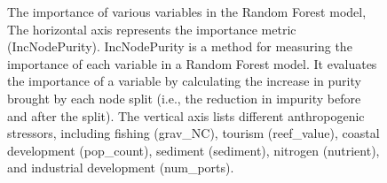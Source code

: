 \documentclass[a4paper, 11]{article}
\begin{document}
\begin{figure}[H]
    \centering
    \caption{The importance of various variables in the Random Forest model, The horizontal axis represents the importance metric (IncNodePurity). IncNodePurity is a method for measuring the importance of each variable in a Random Forest model. It evaluates the importance of a variable by calculating the increase in purity brought by each node split (i.e., the reduction in impurity before and after the split). The vertical axis lists different anthropogenic stressors, including fishing (grav\_NC), tourism (reef\_value), coastal development (pop\_count), sediment (sediment), nitrogen (nutrient), and industrial development (num\_ports).}
\end{figure}
\end{document}
